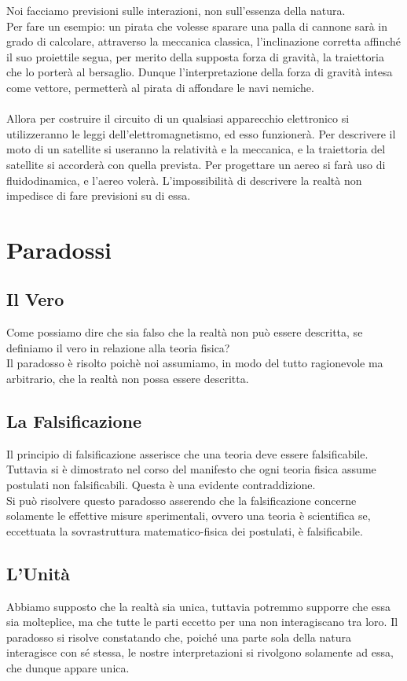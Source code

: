 \documentclass[]{article}
\begin{document}
 Noi facciamo previsioni sulle interazioni, non sull'essenza della natura.\\
	Per fare un esempio: un pirata che volesse sparare una palla di cannone sarà in grado di calcolare, attraverso la meccanica classica, l'inclinazione corretta affinché il suo proiettile segua, per merito della supposta forza di gravità, la traiettoria che lo porterà al bersaglio. Dunque l'interpretazione della forza di gravità intesa come vettore, permetterà al pirata di affondare le navi nemiche.   
	\\
	\\
	Allora per costruire il circuito di un qualsiasi apparecchio elettronico si utilizzeranno le leggi dell'elettromagnetismo, ed esso funzionerà. Per descrivere il moto di un satellite si useranno la relatività e la meccanica, e la traiettoria del satellite si accorderà con quella prevista. Per progettare un aereo si farà uso di fluidodinamica, e l'aereo volerà.  
	L'impossibilità di descrivere la realtà non impedisce di fare previsioni su di essa.
	\section{Paradossi}
	\subsection{Il Vero}
	Come possiamo dire che sia falso che la realtà non può essere descritta, se definiamo il vero in relazione alla teoria fisica?\\
	Il paradosso è risolto poichè noi assumiamo, in modo del tutto ragionevole ma arbitrario, che la realtà non possa essere descritta.
	\subsection{La Falsificazione}
	Il principio di falsificazione asserisce che una teoria deve essere falsificabile. Tuttavia si è dimostrato nel corso del manifesto che ogni teoria fisica assume postulati non falsificabili. Questa è una evidente contraddizione.\\
	Si può risolvere questo paradosso asserendo che la falsificazione concerne solamente le effettive misure sperimentali, ovvero una teoria è scientifica se, eccettuata la sovrastruttura matematico-fisica dei postulati, è falsificabile.
	\subsection{L'Unità}
	Abbiamo supposto che la realtà sia unica, tuttavia potremmo supporre che essa sia molteplice, ma che tutte le parti eccetto per una non interagiscano tra loro.
	Il paradosso si risolve constatando che, poiché una parte sola della natura interagisce con sé stessa, le nostre interpretazioni si rivolgono solamente ad essa, che dunque appare unica.
\end{document}
